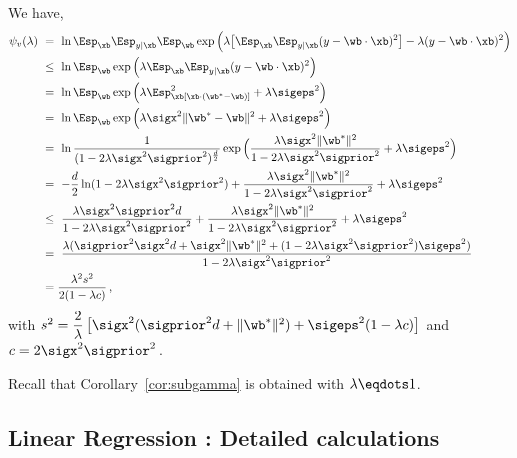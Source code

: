 \documentclass{article}
\theoremstyle{definition}
\theoremstyle{plain}
\begin{document}
We have,
{%
	\begin{align} 
	\psi_v(\lambda) 
	\ &=\ \nonumber
	\ln \Esp_\xb \Esp_{y|\xb} \Esp_\wb \exp\Big( \lambda \big[ \Esp_\xb \Esp_{y|\xb} (y-\wb\cdot \xb )^2  \big] - \lambda(y-\wb\cdot \xb )^2  \Big)\\
	\ &\leq\ \nonumber
	\ln \Esp_\wb \exp\Big( \lambda  \Esp_\xb \Esp_{y|\xb} (y-\wb\cdot \xb )^2\Big) \\
	\ &=\ \nonumber
	\ln \Esp_\wb \exp\Big( \lambda  \Esp_\xb [\xb\cdot(\wb^*-\wb)]^2 + \lambda\sigeps^2 \Big) \\
	&=\ \nonumber
	\ln  \Esp_\wb \exp\Big( \lambda  \sigx^2\|\wb^*-\wb\|^2 + \lambda\sigeps^2 \Big) \\
	\ & = \ \nonumber
	\ln  \frac1{(1-2\lambda\sigx^2\sigprior^2)^{\frac d2}}  \exp\Big(\frac{ \lambda  \sigx^2 \|\wb^*\|^2}{1-2\lambda\sigx^2\sigprior^2}  + \lambda\sigeps^2 \Big) \\
	&=\ \nonumber
	- \frac d2 \ln  (1-2\lambda\sigx^2\sigprior^2)
	+ \frac{ \lambda  \sigx^2 \|\wb^*\|^2}{1-2\lambda\sigx^2\sigprior^2} + \lambda\sigeps^2 \\
	&\leq\ \nonumber
	\frac{\lambda\sigx^2\sigprior^2d}{1-2\lambda\sigx^2\sigprior^2}
	+ \frac{ \lambda  \sigx^2 \|\wb^*\|^2}{1-2\lambda\sigx^2\sigprior^2} + \lambda\sigeps^2 \\
	&=\ \nonumber
	\frac{\lambda(\sigprior^2\sigx^2 d+\sigx^2 \|\wb^*\|^2+ (1-2\lambda\sigx^2\sigprior^2)\sigeps^2)}{1-2\lambda\sigx^2\sigprior^2}\\
	&=\nonumber
	\frac{\lambda^2 s^2}{2(1-\lambda c)}\,,
	\end{align}
}%
with $s^2 = \dfrac2\lambda\left[\sigx^2(\sigprior^2d+ \|\wb^*\|^2)+ \sigeps^2(1-\lambda c)\right]$ and $c = 2\sigx^2\sigprior^2$\,. 

Recall that Corollary~\ref{cor:subgamma} is obtained with $\lambda\eqdots 1$. 

%
%
%
%
%
%
%
%
%
%
%
%
%
%
%
%
%
%
%
%
%
%

%
%
%
%
%
%
%
%
%
%
%
%
%
%
%
%
%
%
%
%
%
%
%
%
%
%
%
%
%
%
%
%
%
%
%
%
%
%
%
%
%
%
%
%

%
%
%
%
%
%
%
%
%
%
%
%
%
%
%
%
%
%
%
%
%
%
%
%
%
%
%
%
%
%
%
%
%
%
%
%
%
%
%
%
%
%
%
%
%
%
%
%
%
%
%
%
%
%
%
%
%
%
%
%
%
%
%
%
%

\subsection{Linear Regression : Detailed calculations}
\label{appendix:linreg}
\end{document}
